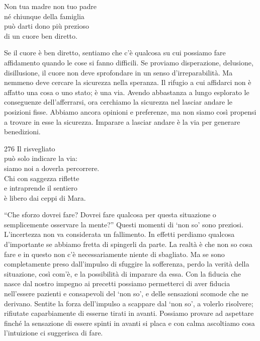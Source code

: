 
\begin{dhpVerse}{43}
\label{dhp-43}
Non tua madre non tuo padre\\
né chiunque della famiglia\\
può darti dono più prezioso\\
di un cuore ben diretto.
\end{dhpVerse}

\begin{dhpRefl}
  Se il cuore è ben diretto, sentiamo che c'è qualcosa su cui possiamo fare
  affidamento quando le cose si fanno difficili. Se proviamo disperazione,
  delusione, disillusione, il cuore non deve sprofondare in un senso
  d'irreparabilità. Ma nemmeno deve cercare la sicurezza nella speranza. Il
  rifugio a cui affidarci non è affatto una cosa o uno stato; è una via. Avendo
  abbastanza a lungo esplorato le conseguenze dell'afferrarsi, ora cerchiamo la
  sicurezza nel lasciar andare le posizioni fisse. Abbiamo ancora opinioni e
  preferenze, ma non siamo così propensi a trovare in esse la sicurezza.
  Imparare a lasciar andare è la via per generare benedizioni.
\end{dhpRefl}


\begin{dhpVerse}{276}
\label{dhp-276}
Il risvegliato\\
può solo indicare la via:\\
siamo noi a doverla percorrere.\\
Chi con saggezza riflette\\
e intraprende il sentiero\\
è libero dai ceppi di Mara.
\end{dhpVerse}

\begin{dhpRefl}
  ``Che sforzo dovrei fare? Dovrei fare qualcosa per questa situazione o
  semplicemente osservare la mente?'' Questi momenti di `non so' sono preziosi.
  L'incertezza non va considerata un fallimento. In effetti perdiamo qualcosa
  d'importante se abbiamo fretta di spingerli da parte. La realtà è che non so
  cosa fare e in questo non c'è necessariamente niente di sbagliato. Ma se sono
  completamente preso dall'impulso di sfuggire la sofferenza, perdo la verità
  della situazione, così com'è, e la possibilità di imparare da essa. Con la
  fiducia che nasce dal nostro impegno ai precetti possiamo permetterci di aver
  fiducia nell'essere pazienti e consapevoli del `non so', e delle sensazioni
  scomode che ne derivano. Sentite la forza dell'impulso a scappare dal `non
  so', a volerlo risolvere; rifiutate caparbiamente di esserne tirati in avanti.
  Possiamo provare ad aspettare finché la sensazione di essere spinti in avanti
  si placa e con calma ascoltiamo cosa l'intuizione ci suggerisca di fare.
\end{dhpRefl}

